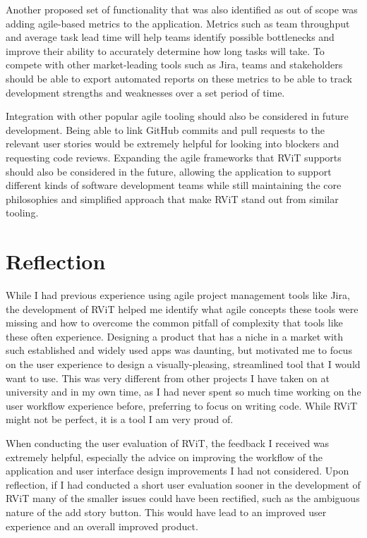 \documentclass[l4proj.tex]{subfiles}
\begin{document}
Another proposed set of functionality that was also identified as out of scope was adding agile-based metrics to the application. Metrics such as team throughput and average task lead time will help teams identify possible bottlenecks and improve their ability to accurately determine how long tasks will take. To compete with other market-leading tools such as Jira, teams and stakeholders should be able to export automated reports on these metrics to be able to track development strengths and weaknesses over a set period of time. 

Integration with other popular agile tooling should also be considered in future development. Being able to link GitHub commits and pull requests to the relevant user stories would be extremely helpful for looking into blockers and requesting code reviews. Expanding the agile frameworks that RViT supports should also be considered in the future, allowing the application to support different kinds of software development teams while still maintaining the core philosophies and simplified approach that make RViT stand out from similar tooling.  


\section{Reflection}
While I had previous experience using agile project management tools like Jira, the development of RViT helped me identify what agile concepts these tools were missing and how to overcome the common pitfall of complexity that tools like these often experience. Designing a product that has a niche in a market with such established and widely used apps was daunting, but motivated me to focus on the user experience to design a visually-pleasing, streamlined tool that I would want to use. This was very different from other projects I have taken on at university and in my own time, as I had never spent so much time working on the user workflow experience before, preferring to focus on writing code. While RViT might not be perfect, it is a tool I am very proud of.

When conducting the user evaluation of RViT, the feedback I received was extremely helpful, especially the advice on improving the workflow of the application and user interface design improvements I had not considered. Upon reflection, if I had conducted a short user evaluation sooner in the development of RViT many of the smaller issues could have been rectified, such as the ambiguous nature of the add story button. This would have lead to an improved user experience and an overall improved product.
\end{document}

